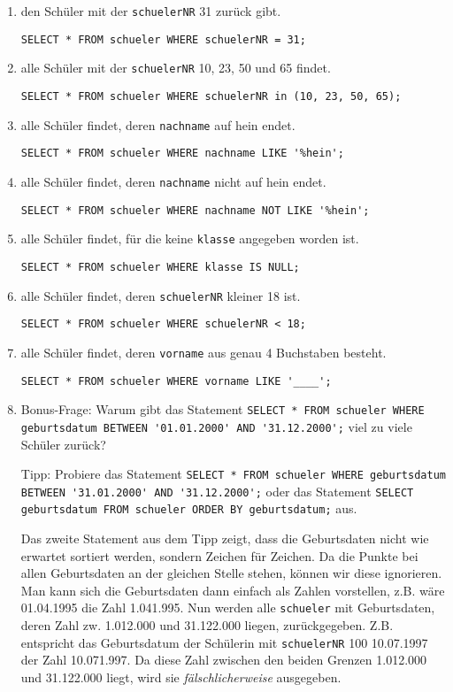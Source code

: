\begin{Answer}[ref=Where]
	\begin{enumerate}
		\item den Schüler mit der \lstinline!schuelerNR! 31 zurück gibt.

		\lstinline!SELECT * FROM schueler WHERE schuelerNR = 31;!
		\item alle Schüler mit der \lstinline!schuelerNR! 10, 23, 50 und 65 findet.

		\lstinline!SELECT * FROM schueler WHERE schuelerNR in (10, 23, 50, 65);!
		\item alle Schüler findet, deren \lstinline!nachname! auf hein endet.

		\lstinline!SELECT * FROM schueler WHERE nachname LIKE '%hein';!
		\item alle Schüler findet, deren \lstinline!nachname! nicht auf hein endet.

		\lstinline!SELECT * FROM schueler WHERE nachname NOT LIKE '%hein';!
		\item alle Schüler findet, für die keine \lstinline!klasse! angegeben worden ist.

		\lstinline!SELECT * FROM schueler WHERE klasse IS NULL;!

		\item alle Schüler findet, deren \lstinline!schuelerNR! kleiner 18 ist.

		\lstinline!SELECT * FROM schueler WHERE schuelerNR < 18;!
		\item alle Schüler findet, deren \lstinline!vorname! aus genau 4 Buchstaben besteht.

		\lstinline!SELECT * FROM schueler WHERE vorname LIKE '____';!
		\item Bonus-Frage: Warum gibt das Statement \lstinline[breaklines=true]!SELECT * FROM schueler WHERE geburtsdatum BETWEEN '01.01.2000' AND '31.12.2000';! viel zu viele Schüler zurück?

		Tipp: Probiere das Statement \lstinline[breaklines=true]!SELECT * FROM schueler WHERE geburtsdatum BETWEEN '31.01.2000' AND '31.12.2000';! oder das Statement \lstinline!SELECT geburtsdatum FROM schueler ORDER BY geburtsdatum;! aus.

		Das zweite Statement aus dem Tipp zeigt, dass die Geburtsdaten nicht wie erwartet sortiert werden, sondern Zeichen für Zeichen. Da die Punkte bei allen Geburtsdaten an der gleichen Stelle stehen, können wir diese ignorieren. Man kann sich die Geburtsdaten dann einfach als Zahlen vorstellen, z.B. wäre 01.04.1995 die Zahl 1.041.995. Nun werden alle \lstinline!schueler! mit Geburtsdaten, deren Zahl zw. 1.012.000 und 31.122.000 liegen, zurückgegeben. Z.B. entspricht das Geburtsdatum der Schülerin mit \lstinline!schuelerNR! 100 10.07.1997 der Zahl 10.071.997. Da diese Zahl zwischen den beiden Grenzen 1.012.000 und 31.122.000 liegt, wird sie \textit{fälschlicherweise} ausgegeben.
	\end{enumerate}
\end{Answer}